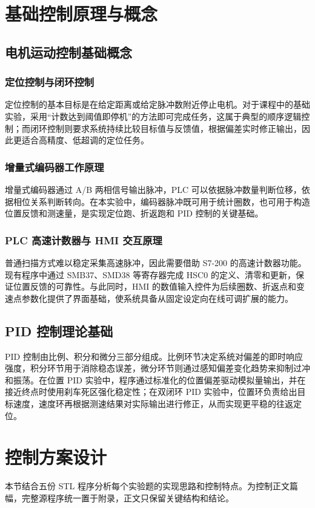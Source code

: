 \documentclass[12pt,a4paper]{ctexart}
\begin{document}
\clearpage
\section{基础控制原理与概念}

\subsection{电机运动控制基础概念}

\subsubsection{定位控制与闭环控制}
定位控制的基本目标是在给定距离或给定脉冲数附近停止电机。对于课程中的基础实验，采用“计数达到阈值即停机”的方法即可完成任务，这属于典型的顺序逻辑控制；而闭环控制则要求系统持续比较目标值与反馈值，根据偏差实时修正输出，因此更适合高精度、低超调的定位任务。

\subsubsection{增量式编码器工作原理}
增量式编码器通过 A/B 两相信号输出脉冲，PLC 可以依据脉冲数量判断位移，依据相位关系判断转向。在本实验中，编码器脉冲既可用于统计圈数，也可用于构造位置反馈和测速量，是实现定位跑、折返跑和 PID 控制的关键基础。

\subsubsection{PLC 高速计数器与 HMI 交互原理}
普通扫描方式难以稳定采集高速脉冲，因此需要借助 S7-200 的高速计数器功能。现有程序中通过 SMB37、SMD38 等寄存器完成 HSC0 的定义、清零和更新，保证位置反馈的可靠性。与此同时，HMI 的数值输入控件为后续圈数、折返点和变速点参数化提供了界面基础，使系统具备从固定设定向在线可调扩展的能力。

\subsection{PID 控制理论基础}
PID 控制由比例、积分和微分三部分组成。比例环节决定系统对偏差的即时响应强度，积分环节用于消除稳态误差，微分环节则通过感知偏差变化趋势来抑制过冲和振荡。在位置 PID 实验中，程序通过标准化的位置偏差驱动模拟量输出，并在接近终点时使用刹车死区强化稳定性；在双闭环 PID 实验中，位置环负责给出目标速度，速度环再根据测速结果对实际输出进行修正，从而实现更平稳的往返定位。

\section{控制方案设计}
本节结合五份 STL 程序分析每个实验题的实现思路和控制特点。为控制正文篇幅，完整源程序统一置于附录，正文只保留关键结构和结论。
\end{document}
